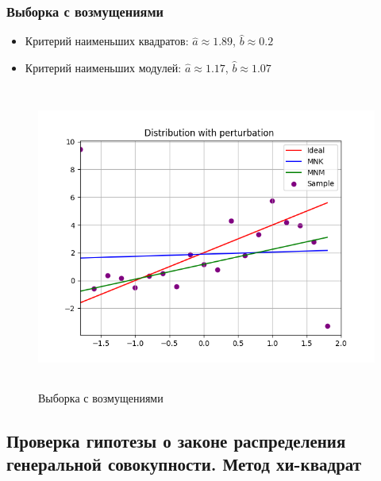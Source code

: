 \subsubsection{Выборка с возмущениями}
	\begin{itemize}
		\item{Критерий наименьших квадратов:}
		$\hat{a}\approx 1.89$, $\hat{b}\approx 0.2$
		\item{Критерий наименьших модулей:}
		$\hat{a}\approx 1.17$, $\hat{b}\approx 1.07$
	\end{itemize}
	\begin{figure}[H]
		\centering
		\includegraphics[width = 12cm, height = 10cm]{res/distr_pert_t2.png}
		\caption{Выборка с возмущениями}
		\label{w_pert}
	\end{figure}


\subsection{Проверка гипотезы о законе распределения генеральной совокупности. Метод хи-квадрат}
    
